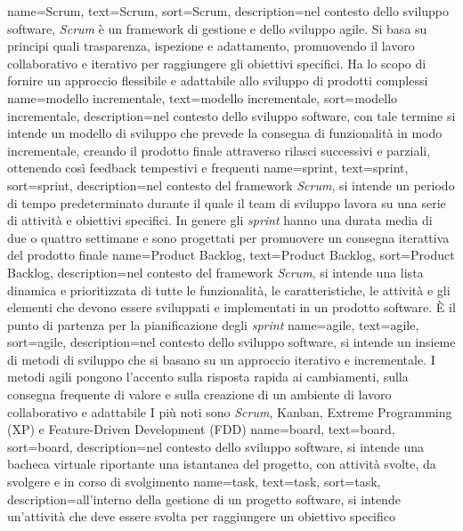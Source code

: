 {
    name={Scrum},
    text=Scrum,
    sort=Scrum,
    description={nel contesto dello sviluppo software, \textit{Scrum} è un framework di gestione e dello sviluppo agile. Si basa su principi quali trasparenza, ispezione 
    e adattamento, promuovendo il lavoro collaborativo e iterativo per raggiungere gli obiettivi specifici. Ha lo scopo di fornire un approccio 
    flessibile e adattabile allo sviluppo di prodotti complessi}
}
{
    name={modello incrementale},
    text=modello incrementale,
    sort=modello incrementale,
    description={nel contesto dello sviluppo software, con tale termine si intende un modello di sviluppo che prevede la consegna di funzionalità in modo incrementale, creando 
    il prodotto finale attraverso rilasci successivi e parziali, ottenendo così feedback tempestivi e frequenti}
}
{
    name={sprint},
    text=sprint,
    sort=sprint,
    description={nel contesto del framework \textit{Scrum}, si intende un periodo di tempo predeterminato durante il quale il team di sviluppo lavora su una serie di attività e obiettivi specifici. In genere 
    gli \textit{sprint} hanno una durata media di due o quattro settimane e sono progettati per promuovere un consegna iterattiva 
    del prodotto finale}
}
{
    name={Product Backlog},
    text=Product Backlog,
    sort=Product Backlog,
    description={nel contesto del framework \textit{Scrum}, si intende una lista dinamica e prioritizzata di tutte le funzionalità, le caratteristiche, le attività e gli elementi che devono essere sviluppati e implementati in un prodotto software. È
    il punto di partenza per la pianificazione degli \textit{sprint}}
}
{
    name={agile},
    text=agile,
    sort=agile,
    description={nel contesto dello sviluppo software, si intende un insieme di metodi di sviluppo che si basano su un approccio iterativo e incrementale. 
    I metodi agili pongono l'accento sulla risposta rapida ai cambiamenti, sulla consegna frequente di valore e sulla creazione di un ambiente di lavoro collaborativo e adattabile
    I più noti sono \textit{Scrum}, Kanban, Extreme Programming (XP) e Feature-Driven Development (FDD)}
}
{
    name={board},
    text=board,
    sort=board,
    description={nel contesto dello sviluppo software, si intende una bacheca virtuale riportante 
    una istantanea del progetto, con attività svolte, da svolgere e in corso di svolgimento}
}
{
    name={task},
    text=task,
    sort=task,
    description={all'interno della gestione di un progetto software, si intende un'attività che deve essere svolta per raggiungere un obiettivo specifico}
}
